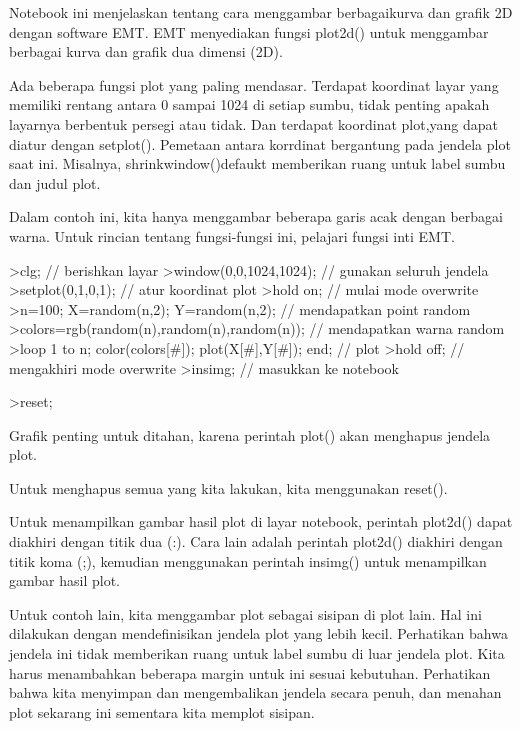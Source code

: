 \documentclass{article}
\begin{document}
\begin{eulernotebook}
\begin{eulercomment}
Notebook ini menjelaskan tentang cara menggambar berbagaikurva dan
grafik 2D dengan software EMT. EMT menyediakan fungsi plot2d() untuk
menggambar berbagai kurva dan grafik dua dimensi (2D).

\end{eulercomment}
\begin{eulercomment}
Ada beberapa fungsi plot yang paling mendasar. Terdapat koordinat
layar yang memiliki rentang antara 0 sampai 1024 di setiap sumbu,
tidak penting apakah layarnya berbentuk persegi atau tidak. Dan
terdapat koordinat plot,yang dapat diatur dengan setplot(). Pemetaan
antara korrdinat bergantung pada jendela plot saat ini. Misalnya,
shrinkwindow()defaukt memberikan ruang untuk label sumbu dan judul
plot.

Dalam contoh ini, kita hanya menggambar beberapa garis acak dengan
berbagai warna. Untuk rincian tentang fungsi-fungsi ini, pelajari
fungsi inti EMT.
\end{eulercomment}
\begin{eulerprompt}
>clg; // berishkan layar
>window(0,0,1024,1024); // gunakan seluruh jendela
>setplot(0,1,0,1); // atur koordinat plot
>hold on; // mulai mode overwrite
>n=100; X=random(n,2); Y=random(n,2);  // mendapatkan point random
>colors=rgb(random(n),random(n),random(n)); // mendapatkan warna random
>loop 1 to n; color(colors[#]); plot(X[#],Y[#]); end; // plot
>hold off; // mengakhiri mode overwrite
>insimg; // masukkan ke notebook
\end{eulerprompt}
\begin{eulerprompt}
>reset;
\end{eulerprompt}
\begin{eulercomment}
Grafik penting untuk ditahan, karena perintah plot() akan menghapus
jendela plot.

Untuk menghapus semua yang kita lakukan, kita menggunakan reset().

Untuk menampilkan gambar hasil plot di layar notebook, perintah
plot2d() dapat diakhiri dengan titik dua (:). Cara lain adalah
perintah plot2d() diakhiri dengan titik koma (;), kemudian menggunakan
perintah insimg() untuk menampilkan gambar hasil plot.

Untuk contoh lain, kita menggambar plot sebagai sisipan di plot lain.
Hal ini dilakukan dengan mendefinisikan jendela plot yang lebih kecil.
Perhatikan bahwa jendela ini tidak memberikan ruang untuk label sumbu
di luar jendela plot. Kita harus menambahkan beberapa margin untuk ini
sesuai kebutuhan. Perhatikan bahwa kita menyimpan dan mengembalikan
jendela secara penuh, dan menahan plot sekarang ini sementara kita
memplot sisipan.


\end{eulercomment}
\end{eulernotebook}
\end{document}
